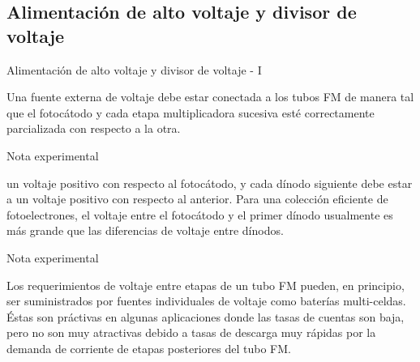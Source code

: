 \documentclass[a4paper,10pt]{beamer}
\begin{document}
\subsection{Alimentación de alto voltaje y divisor de voltaje}
\begin{frame}{Alimentación de alto voltaje y divisor de voltaje - I}
  
 \begin{justify} 
 Una fuente externa de voltaje debe estar conectada a los tubos FM de manera tal que 
 el fotocátodo y cada etapa multiplicadora sucesiva esté correctamente parcializada 
 con respecto a la otra.
 
 \begin{exampleblock}{Nota experimental}
 \begin{justify}
  un voltaje positivo con respecto al fotocátodo, y cada dínodo siguiente debe estar 
  a un voltaje positivo con respecto al anterior. Para una colección eficiente de 
  fotoelectrones, el voltaje entre el fotocátodo y el primer dínodo usualmente 
  es más grande que las diferencias de voltaje entre dínodos.
  \end{justify}
 \end{exampleblock}
 
\begin{exampleblock}{Nota experimental}
 \begin{justify}
  Los requerimientos de voltaje entre etapas de un tubo FM pueden, en principio, 
  ser suministrados por fuentes individuales de voltaje como baterías multi-celdas.
  Éstas son práctivas en algunas aplicaciones donde las tasas de cuentas son baja, pero 
  no son muy atractivas debido a tasas de descarga muy rápidas por la demanda 
  de corriente de etapas posteriores del tubo FM.
  \end{justify}
 \end{exampleblock}
 
 \end{justify}
\end{frame}
\end{document}
